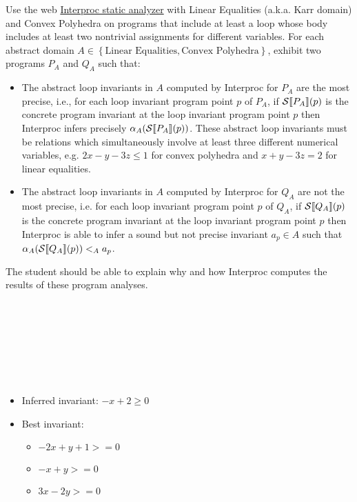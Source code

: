 \begin{exercise}{
    Use the web \href{http://pop-art.inrialpes.fr/interproc/interprocweb.cgi}{Interproc static analyzer} with Linear Equalities (a.k.a. Karr domain) and Convex Polyhedra on programs that include at least a loop whose body includes at least two nontrivial assignments for different variables. For each abstract domain  $A \in \left\{\text{Linear Equalities}, \text{Convex Polyhedra}\right\}$, exhibit two programs $P_A$ and $Q_A$ such that:
    \begin{itemize}
        \item The abstract loop invariants in $A$ computed by Interproc for $P_A$ are the most precise, i.e., for each loop invariant program point $p$ of $P_A$, if $\mathcal{S} \llbracket P_A \rrbracket(p)$ is the concrete program invariant at the loop invariant program point $p$ then Interproc infers precisely $\alpha_A(\mathcal{S} \llbracket P_A \rrbracket(p))$. These abstract loop invariants must be relations which simultaneously involve at least three different numerical variables, e.g. $2x - y -3z \leq 1$ for convex polyhedra and $x + y - 3z = 2$ for linear equalities.
        \item The abstract loop invariants in $A$ computed by Interproc for $Q_A$ are not the most precise, i.e. for each loop invariant program point $p$ of $Q_A$, if $\mathcal{S} \llbracket Q_A \rrbracket(p)$ is the concrete program invariant at the loop invariant program point $p$ then Interproc is able to infer a sound but not precise invariant $a_p \in A$ such that $\alpha_A(\mathcal{S} \llbracket Q_A \rrbracket(p)) <_A a_p$.
    \end{itemize}
    The student should be able to explain why and how Interproc computes the results of these program analyses.
}
    \newcommand{\program}[3]{
        \begin{minipage}[t]{.48\textwidth}
            \centering
            
        \end{minipage}
        \hfill
        \begin{minipage}[t]{.48\textwidth}
            \vspace*{1cm}
            #3
        \end{minipage}
        \\
    }
    \vspace*{-0.6cm}\\
    \program{p_le.simple}{P_\text{Linear Equalities}}{}
    \program{q_le.simple}{Q_\text{Linear Equalities}}{}
    \program{p_cp.simple}{P_\text{Convex Polyhedra}}{}
    \program{q_cp.simple}{Q_\text{Convex Polyhedra}}{
        \begin{itemize}
            \item Inferred invariant: $-x + 2 \geq 0$
            \item Best invariant:
                \begin{itemize}
                    \item[] $-2x+y+1>=0$
                    \item[] $-x+y>=0$
                    \item[] $3x-2y>=0$
                \end{itemize}
        \end{itemize}
    }
\end{exercise}
